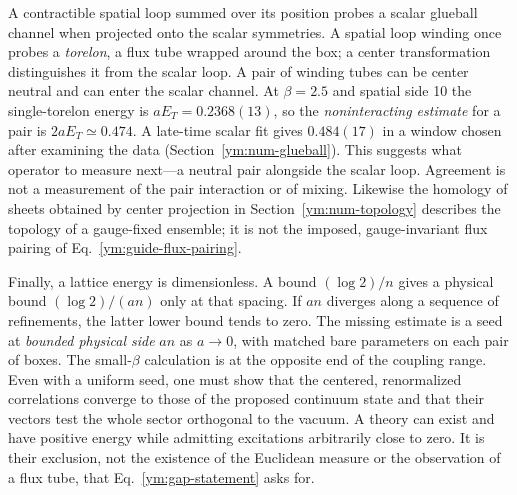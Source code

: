 A contractible spatial loop summed over its position probes a scalar
glueball channel when projected onto the scalar symmetries. A spatial loop
winding once probes a \emph{torelon}, a flux tube wrapped around the box;
a center transformation distinguishes it from the scalar loop. A pair of
winding tubes can be center neutral and can enter the scalar channel.
At $\beta=2.5$ and spatial side 10 the single-torelon energy is
$aE_T=0.2368(13)$, so the \emph{noninteracting estimate} for a pair is
$2aE_T\simeq0.474$. A late-time scalar fit gives $0.484(17)$ in a window
chosen after examining the data (Section~\ref{ym:num-glueball}). This
suggests what operator to measure next---a neutral pair alongside the
scalar loop. Agreement is not a measurement of the pair interaction or
of mixing. Likewise the homology of sheets obtained by center projection
in Section~\ref{ym:num-topology} describes the topology of a gauge-fixed
ensemble; it is not the imposed, gauge-invariant flux pairing of
Eq.~\eqref{ym:guide-flux-pairing}.

Finally, a lattice energy is dimensionless. A bound $(\log2)/n$ gives a
physical bound $(\log2)/(a n)$ only at that spacing. If $a n$ diverges
along a sequence of refinements, the latter lower bound tends to zero.
The missing estimate is a seed at \emph{bounded physical side} $a n$ as
$a\to0$, with matched bare parameters on each pair of boxes. The
small-$\beta$ calculation is at the opposite end of the coupling range.
Even with a uniform seed, one must show that the centered, renormalized
correlations converge to those of the proposed continuum state and that
their vectors test the whole sector orthogonal to the vacuum. A theory can
exist and have positive energy while admitting excitations arbitrarily
close to zero. It is their exclusion, not the existence of the Euclidean
measure or the observation of a flux tube, that Eq.~\eqref{ym:gap-statement}
asks for.
